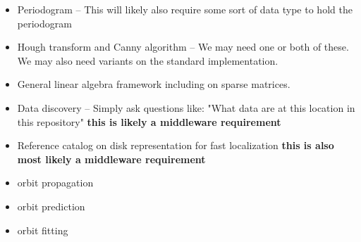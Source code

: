 \begin{itemize}
\item Periodogram -- This will likely also require some sort of data type to hold the periodogram
\item Hough transform and Canny algorithm -- We may need one or both of these.  We may also need variants on the standard implementation.
\item General linear algebra framework including on sparse matrices.
\item Data discovery -- Simply ask questions like: "What data are at this location in this repository" {\bf this is likely a middleware requirement}
\item Reference catalog on disk representation for fast localization {\bf this is also most likely a middleware requirement}
\item orbit propagation
\item orbit prediction
\item orbit fitting
\end{itemize}
